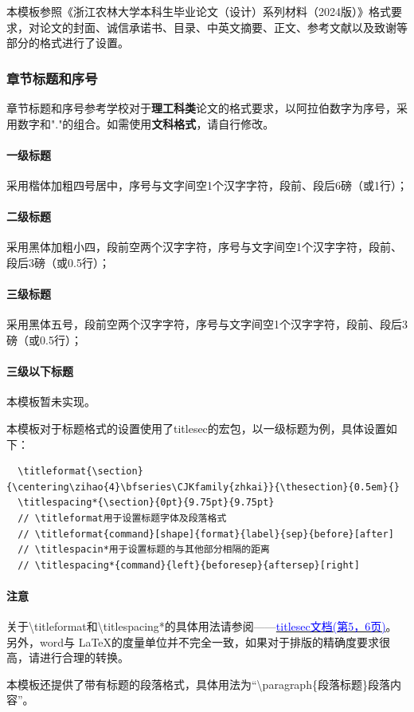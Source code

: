 \documentclass[AutoFakeBold]{ZafuThesis}
\begin{document}
本模板参照《浙江农林大学本科生毕业论文（设计）系列材料（2024版）》格式要求，对论文的封面、诚信承诺书、目录、中英文摘要、正文、参考文献以及致谢等部分的格式进行了设置。

\subsubsection{章节标题和序号}

章节标题和序号参考学校对于\textbf{理工科类}论文的格式要求，以阿拉伯数字为序号，采用数字和"."的组合。如需使用\textbf{文科格式}，请自行修改。
\paragraph{一级标题}采用楷体加粗四号居中，序号与文字间空1个汉字字符，段前、段后6磅（或1行）；
\paragraph{二级标题}采用黑体加粗小四，段前空两个汉字字符，序号与文字间空1个汉字字符，段前、段后3磅（或0.5行）；
\paragraph{三级标题}采用黑体五号，段前空两个汉字字符，序号与文字间空1个汉字字符，段前、段后3磅（或0.5行）；
\paragraph{三级以下标题}本模板暂未实现。

\par 本模板对于标题格式的设置使用了titlesec的宏包，以一级标题为例，具体设置如下：
\begin{lstlisting}
  \titleformat{\section}{\centering\zihao{4}\bfseries\CJKfamily{zhkai}}{\thesection}{0.5em}{}
  \titlespacing*{\section}{0pt}{9.75pt}{9.75pt}
  // \titleformat用于设置标题字体及段落格式 
  // \titleformat{command}[shape]{format}{label}{sep}{before}[after]
  // \titlespacin*用于设置标题的与其他部分相隔的距离
  // \titlespacing*{command}{left}{beforesep}{aftersep}[right]
\end{lstlisting}
\paragraph{注意} 关于\textbackslash titleformat和\textbackslash titlespacing*的具体用法请参阅——\href{https://static.latexstudio.net/wp-content/uploads/2016/12/titlesec_c.pdf}{\textcolor{blue}{titlesec文档(第5，6页)}}。另外，word与 \LaTeX 的度量单位并不完全一致，如果对于排版的精确度要求很高，请进行合理的转换。
\par 本模板还提供了带有标题的段落格式，具体用法为“\textbackslash paragraph\{段落标题\}段落内容”。
\end{document}
